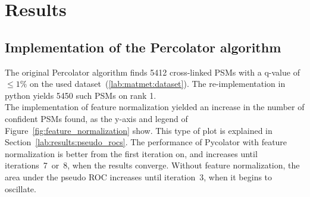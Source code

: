 \chapter{Results}
\label{results}


\section{Implementation of the Percolator algorithm}
The original Percolator algorithm finds 5412 cross-linked PSMs with a q-value of $\leq1\%$ on the used dataset~(\ref{lab:matmet:dataset}). The re-implementation in python yields 5450 such PSMs on rank 1.\\
The implementation of feature normalization yielded an increase in the number of confident PSMs found, as the y-axis and legend of Figure~\ref{fig:feature_normalization} show. This type of plot is explained in Section~\ref{lab:results:pseudo_rocs}. The performance of Pycolator with feature normalization is better from the first iteration on, and increases until iterations~7~or~8, when the results converge. Without feature normalization, the area under the pseudo ROC increases until iteration~3, when it begins to oscillate. \\
\renewcommand{\baselinestretch}{0.9}
